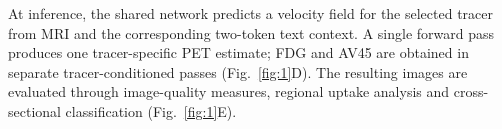 At inference, the shared network predicts a velocity field for the selected tracer from MRI and the corresponding two-token text context. A single forward pass produces one tracer-specific PET estimate; FDG and AV45 are obtained in separate tracer-conditioned passes (Fig.~\ref{fig:1}D). The resulting images are evaluated through image-quality measures, regional uptake analysis and cross-sectional classification (Fig.~\ref{fig:1}E).
